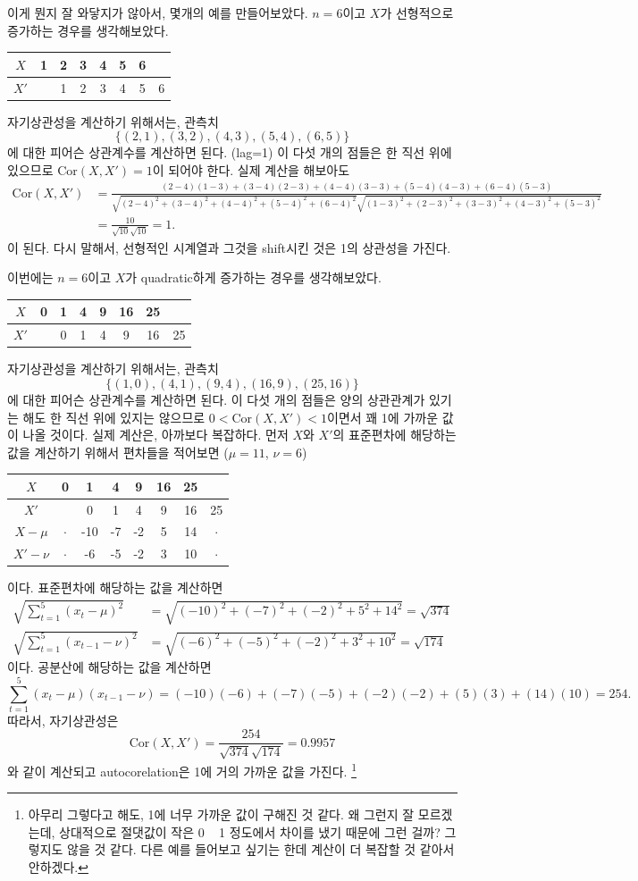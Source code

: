 \documentclass{article}
\begin{document}
이게 뭔지 잘 와닿지가 않아서, 몇개의 예를 만들어보았다.
\(n=6\)이고 \(X\)가 선형적으로 증가하는 경우를 생각해보았다.
\begin{center}
\begin{tabular}{c|ccccccc}
$X$ &1&2&3&4&5&6&\\\hline
$X'$& &1&2&3&4&5&6
\end{tabular}
\end{center}
자기상관성을 계산하기 위해서는, 관측치
\[\{(2,1),(3,2),(4,3),(5,4),(6,5)\}\]
에 대한 피어슨 상관계수를 계산하면 된다. (lag=1)
이 다섯 개의 점들은 한 직선 위에 있으므로 \(\text{Cor}(X,X')=1\)이 되어야 한다.
실제 계산을 해보아도
\begin{align*}
\text{Cor}(X,X')
&=\frac{(2-4)(1-3)+(3-4)(2-3)+(4-4)(3-3)+(5-4)(4-3)+(6-4)(5-3)}{\sqrt{(2-4)^2+(3-4)^2+(4-4)^2+(5-4)^2+(6-4)^2}\sqrt{(1-3)^2+(2-3)^2+(3-3)^2+(4-3)^2+(5-3)^2}}\\
&=\frac{10}{\sqrt{10}\sqrt{10}}=1.
\end{align*}
이 된다.
다시 말해서, 선형적인 시계열과 그것을 shift시킨 것은 1의 상관성을 가진다.

이번에는 $n=6$이고 $X$가 quadratic하게 증가하는 경우를 생각해보았다.
\begin{center}
\begin{tabular}{c|ccccccc}
$X$ &0&1&4&9&16&25&\\\hline
$X'$& &0&1&4&9&16&25
\end{tabular}
\end{center}
자기상관성을 계산하기 위해서는, 관측치
\[\{(1,0),(4,1),(9,4),(16,9),(25,16)\}\]
에 대한 피어슨 상관계수를 계산하면 된다.
이 다섯 개의 점들은 양의 상관관계가 있기는 해도 한 직선 위에 있지는 않으므로 \(0<\text{Cor}(X,X')<1\)이면서 꽤 1에 가까운 값이 나올 것이다.
실제 계산은, 아까보다 복잡하다.
먼저 $X$와 $X'$의 표준편차에 해당하는 값을 계산하기 위해서 편차들을 적어보면 (\(\mu=11\), \(\nu=6\))
\begin{center}
\begin{tabular}{c|ccccccc}
$X$ &0&1&4&9&16&25&\\\hline
$X'$& &0&1&4&9&16&25\\\hline
$X-\mu$&$\cdot$&-10&-7&-2&5&14&$\cdot$\\\hline
$X'-\nu$&$\cdot$&-6&-5&-2&3&10&$\cdot$
\end{tabular}
\end{center}
이다.
표준편차에 해당하는 값을 계산하면
\begin{align*}
\sqrt{\sum_{t=1}^5(x_t-\mu)^2}
&=\sqrt{(-10)^2+(-7)^2+(-2)^2+5^2+14^2}=\sqrt{374}\\
\sqrt{\sum_{t=1}^5(x_{t-1}-\nu)^2}
&=\sqrt{(-6)^2+(-5)^2+(-2)^2+3^2+10^2}=\sqrt{174}
\end{align*}
이다. 공분산에 해당하는 값을 계산하면
\[\sum_{t=1}^5(x_t-\mu)(x_{t-1}-\nu)=(-10)(-6)+(-7)(-5)+(-2)(-2)+(5)(3)+(14)(10)=254.\]
따라서, 자기상관성은
\[\text{Cor}(X,X')=\frac{254}{\sqrt{374}\sqrt{174}}=0.9957\]
와 같이 계산되고 autocorelation은 1에 거의 가까운 값을 가진다.
\footnote{아무리 그렇다고 해도, 1에 너무 가까운 값이 구해진 것 같다.
왜 그런지 잘 모르겠는데, 상대적으로 절댓값이 작은 0 ~ 1 정도에서 차이를 냈기 때문에 그런 걸까? 그렇지도 않을 것 같다.
다른 예를 들어보고 싶기는 한데 계산이 더 복잡할 것 같아서 안하겠다.}
\end{document}
